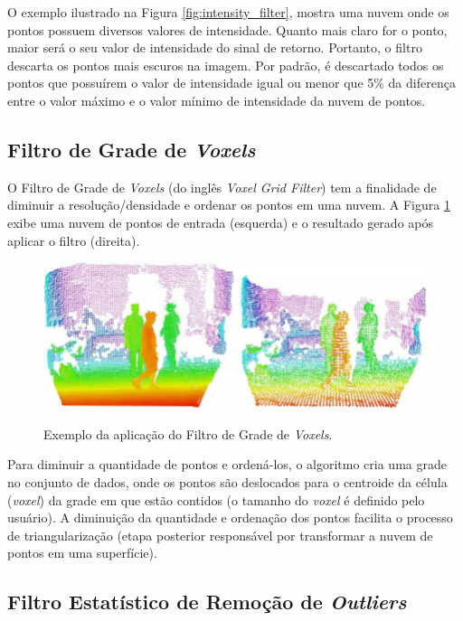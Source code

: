 O exemplo ilustrado na Figura \ref{fig:intensity_filter}, mostra uma nuvem onde os pontos possuem diversos valores de intensidade. 
Quanto mais claro for o ponto, maior será o seu valor de intensidade do sinal de retorno. 
Portanto, o filtro descarta os pontos mais escuros na imagem.
Por padrão, é descartado todos os pontos que possuírem o valor de intensidade igual ou menor que 5\% da diferença entre o valor máximo e o valor mínimo de intensidade da nuvem de pontos.

\subsection{Filtro de Grade de \textit{Voxels}}
\label{sec:voxelgrid_filter}

O Filtro de Grade de \textit{Voxels} (do inglês \textit{Voxel Grid Filter}) tem a finalidade de diminuir a resolução/densidade e ordenar os pontos em uma nuvem. 
A Figura \ref{fig:voxelgrid_filter} exibe uma nuvem de pontos de entrada (esquerda) e o resultado gerado após aplicar o filtro (direita).

\begin{figure}[H]
    \centering
    \caption{Exemplo da aplicação do Filtro de Grade de \textit{Voxels}.}
    \includegraphics[scale=0.4]{dados/figuras/voxelgrid_filter.png}
    \label{fig:voxelgrid_filter}
\end{figure}

Para diminuir a quantidade de pontos e ordená-los, o algoritmo cria uma grade no conjunto de dados, onde os pontos são deslocados para o centroide da célula (\textit{voxel}) da grade em que estão contidos (o tamanho do \textit{voxel} é definido pelo usuário). A diminuição da quantidade e ordenação dos pontos facilita o processo de triangularização (etapa posterior responsável por transformar a nuvem de pontos em uma superfície).

\subsection{Filtro Estatístico de Remoção de \textit{Outliers}}
\label{sec:statistical_outlier_removal}

